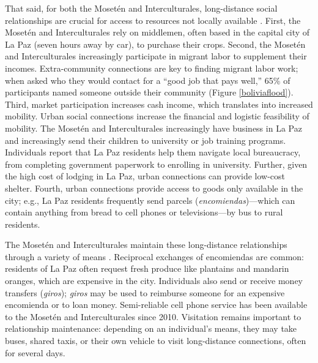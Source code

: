 \documentclass[bibauthoryear]{aa}
\begin{document}
That said, for both the Moset\'en and Interculturales, long-distance social relationships are crucial for access to resources not locally available \citep{pisorjones2020}. %
 First, the Moset\'en and Interculturales rely on middlemen, often based in the capital city of La Paz (seven hours away by car), to purchase their crops. Second, the Moset\'en and Interculturales increasingly participate in migrant labor to supplement their incomes. Extra-community connections are key to finding migrant labor work; when asked who they would contact for a ``good job that pays well,'' 65\% of participants named someone outside their community (Figure \ref{boliviaflood}). Third, market participation increases cash income, which translates into increased mobility. Urban social connections increase the financial and logistic feasibility of mobility. The Moset\'en and Interculturales increasingly have business in La Paz and increasingly send their children to university or job training programs. Individuals report that La Paz residents help them navigate local bureaucracy, from completing government paperwork to enrolling in university. Further, given the high cost of lodging in La Paz, urban connections can provide low-cost shelter. Fourth, urban connections provide access to goods only available in the city; e.g., La Paz residents frequently send parcels (\textit{encomiendas})---which can contain anything from bread to cell phones or televisions---by bus to rural residents.

	The Moset\'en and Interculturales maintain these long-distance relationships through a variety of means \citep{pisorjones2020}. Reciprocal exchanges of encomiendas are common: residents of La Paz often request fresh produce like plantains and mandarin oranges, which are expensive in the city. Individuals also send or receive money transfers (\textit{giros}); \textit{giros} may be used to reimburse someone for an expensive encomienda or to loan money. Semi-reliable cell phone service has been available to the Moset\'en and Interculturales since 2010. %
	 Visitation remains important to relationship maintenance: depending on an individual's means, they may take buses, shared taxis, or their own vehicle to visit long-distance connections, often for several days.
	
\end{document}
